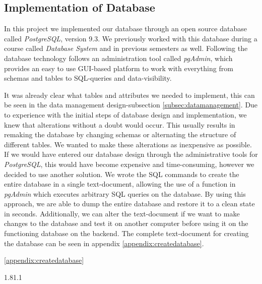 \subsection{Implementation of Database}
\label{subsec:dbImpl}
In this project we implemented our database through an open source database called \textit{PostgreSQL}\cite{postgreSQL}, version 9.3. We previously worked with this database during a course called \textit{Database System} and in previous semesters as well. Following the database technology follows an administration tool called \textit{pgAdmin}\cite{pgAdmin}, which provides an easy to use GUI-based platform to work with everything from schemas and tables to SQL-queries and data-visibility. 

It was already clear what tables and attributes we needed to implement, this can be seen in the data management design-subsection \ref{subsec:datamanagement}. Due to experience with the initial steps of database design and implementation, we knew that alterations without a doubt would occur. This usually results in remaking the database by changing schemas or alternating the structure of different tables. We wanted to make these alterations as inexpensive as possible. If we would have entered our database design through the administrative tools for \textit{PostgreSQL}, this would have become expensive and time-consuming, however we decided to use another solution. We wrote the SQL commands to create the entire database in a single text-document, allowing the use of a function in \textit{pgAdmin} which executes arbitrary SQL queries on the database. By using this approach, we are able to dump the entire database and restore it to a clean state in seconds. Additionally, we can alter the text-document if we want to make changes to the database and test it on another computer before using it on the functioning database on the backend. The complete text-document for creating the database can be seen in appendix \ref{appendix:createdatabase}. 





\ref{appendix:createdatabase}

\cite{postgreSQL}
\cite{pgAdmin}
\cite{npgsql}

\cite{datarow}
1.81.1
